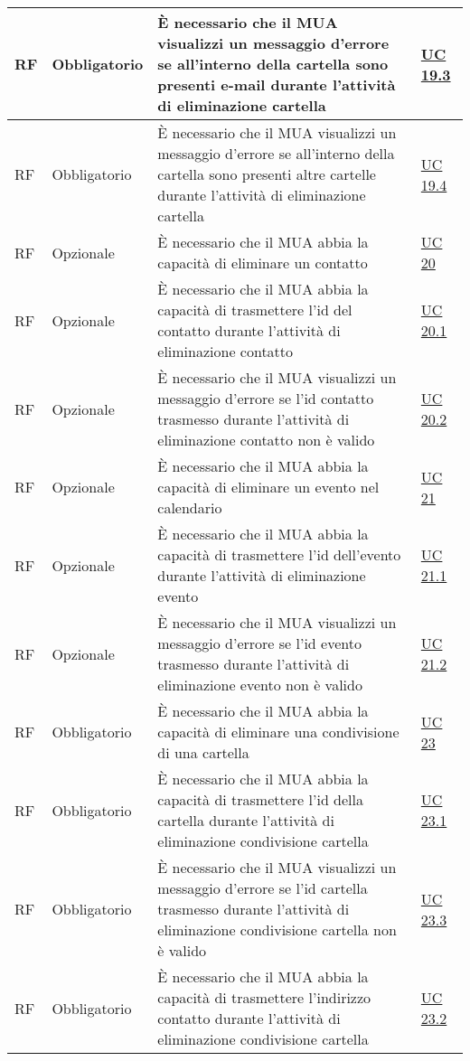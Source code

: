 \begin{longtable}{*{1}{>{\centering\arraybackslash}p{1.5cm}}*{1}{>{\centering\arraybackslash}p{2.5cm}}p{6cm}*{1}{>{\centering\arraybackslash}p{3cm}}}
    \\\hline
    RF & Obbligatorio & È necessario che il MUA visualizzi un messaggio d'errore se all'interno della cartella sono presenti e-mail durante l'attività di eliminazione cartella & \hyperref[sec:UC19.3]{UC 19.3}
    \\\hline
    RF & Obbligatorio & È necessario che il MUA visualizzi un messaggio d'errore se all'interno della cartella sono presenti altre cartelle durante l'attività di eliminazione cartella & \hyperref[sec:UC19.4]{UC 19.4}
    \\\hline
    RF & Opzionale & È necessario che il MUA abbia la capacità di eliminare un contatto & \hyperref[sec:UC20]{UC 20}
    \\\hline
    RF & Opzionale & È necessario che il MUA abbia la capacità di trasmettere l'id del contatto durante l'attività di eliminazione contatto & \hyperref[sec:UC20.1]{UC 20.1}
    \\\hline
    RF & Opzionale & È necessario che il MUA visualizzi un messaggio d'errore se l'id contatto trasmesso durante l'attività di eliminazione contatto non è valido & \hyperref[sec:UC20.2]{UC 20.2}
    \\\hline
    RF & Opzionale & È necessario che il MUA abbia la capacità di eliminare un evento nel calendario & \hyperref[sec:UC21]{UC 21}
    \\\hline
    RF & Opzionale & È necessario che il MUA abbia la capacità di trasmettere l'id dell'evento durante l'attività di eliminazione evento & \hyperref[sec:UC21.1]{UC 21.1}
    \\\hline
    RF & Opzionale & È necessario che il MUA visualizzi un messaggio d'errore se l'id evento trasmesso durante l'attività di eliminazione evento non è valido & \hyperref[sec:UC21.2]{UC 21.2}
    \\\hline
    RF & Obbligatorio & È necessario che il MUA abbia la capacità di eliminare una condivisione di una cartella & \hyperref[sec:UC23]{UC 23}
    \\\hline
    RF & Obbligatorio & È necessario che il MUA abbia la capacità di trasmettere l'id della cartella durante l'attività di eliminazione condivisione cartella & \hyperref[sec:UC23.1]{UC 23.1}
    \\\hline
    RF & Obbligatorio & È necessario che il MUA visualizzi un messaggio d'errore se l'id cartella trasmesso durante l'attività di eliminazione condivisione cartella non è valido & \hyperref[sec:UC23.3]{UC 23.3}
    \\\hline
    RF & Obbligatorio & È necessario che il MUA abbia la capacità di trasmettere l'indirizzo contatto durante l'attività di eliminazione condivisione cartella & \hyperref[sec:UC23.2]{UC 23.2}

\end{longtable}
